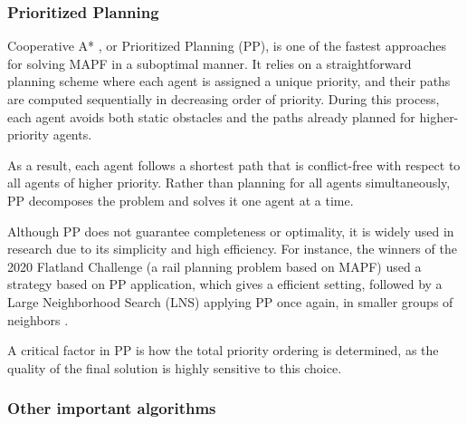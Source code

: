 \subsubsection{Prioritized Planning}
Cooperative A* \cite{silverCooperativePathfinding2005}, or Prioritized Planning (PP), is one of the fastest approaches for solving MAPF in a suboptimal manner. It relies on a straightforward planning scheme where each agent is assigned a unique priority, and their paths are computed sequentially in decreasing order of priority. During this process, each agent avoids both static obstacles and the paths already planned for higher-priority agents.

As a result, each agent follows a shortest path that is conflict-free with respect to all agents of higher priority. Rather than planning for all agents simultaneously, PP decomposes the problem and solves it one agent at a time.

Although PP does not guarantee completeness or optimality, it is widely used in research due to its simplicity and high efficiency. For instance, the winners of the 2020 Flatland Challenge (a rail planning problem based on MAPF) used a strategy based on PP application, which gives a efficient setting, followed by a Large Neighborhood Search (LNS) applying PP once again, in smaller groups of neighbors \cite{liScalableRailPlanning2021a}.

A critical factor in PP is how the total priority ordering is determined, as the quality of the final solution is highly sensitive to this choice.

\subsubsection{Other important algorithms}

